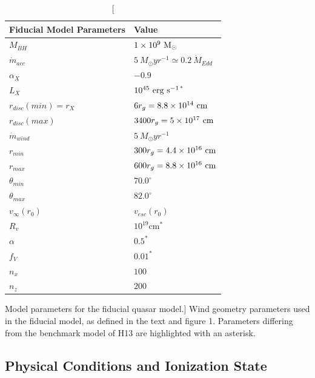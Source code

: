 \begin{table}
\centering
\begin{tabular}{p{3cm}p{4cm}}
\hline Fiducial Model Parameters 	&	 Value \\ 
\hline \hline 
$M_{BH}$ 	 &	 $1\times 10^9~\rm{M_{\odot}}$ \\ 
$\dot{m}_{acc}$ 	 &	 $5~M_{\odot}yr^{-1} \simeq 0.2~\dot{M}_{Edd}$\\ 
$\alpha_X$ 	 &	 $-0.9$ \\ 
$L_{X} $ 	 &	 $10^{45}~\rm{erg~s^{-1}}$$^*$ \\ 
$r_{disc}(min)=r_{X}$   &	 $6r_g=8.8\times10^{14}~{\rm cm}$ \\ 
$r_{disc}(max)$   &	 $3400r_g = 5\times10^{17}~{\rm cm}$ \\ 
$\dot{m}_{wind}$  &	 $5~M_{\odot}yr^{-1}$ \\ 
$r_{min}$ 	&	 $300r_{g} = 4.4\times10^{16}~{\rm cm}$\\ 
$r_{max}$ 	&	 $600r_{g} = 8.8\times10^{16}~{\rm cm}$ \\ 
$\theta_{min}$ 	&	 $70.0^{\circ}$ \\ 
$\theta_{max}$ 	&	 $82.0^{\circ}$ \\ 
$v_{\infty}(r_0)$ 	&	 $v_{esc}(r_0)$ \\ 
$R_v$  	        &	 $10^{19}$cm$^*$ \\ 
$\alpha$ 	&	 $0.5^*$ \\
$f_V$ 	&	 $0.01^*$  \\
$n_x$ 	&	 $100$  \\
$n_z$ 	&	 $200$  \\
\end{tabular}
\caption
[Model parameters for the fiducial quasar model.]
{Wind geometry parameters 
used in the fiducial model, as defined in the text and figure 1.
Parameters differing from the benchmark model of H13 are 
highlighted with an asterisk.}
\label{wind_param}
\end{table}



\subsection{Physical Conditions and Ionization State}


